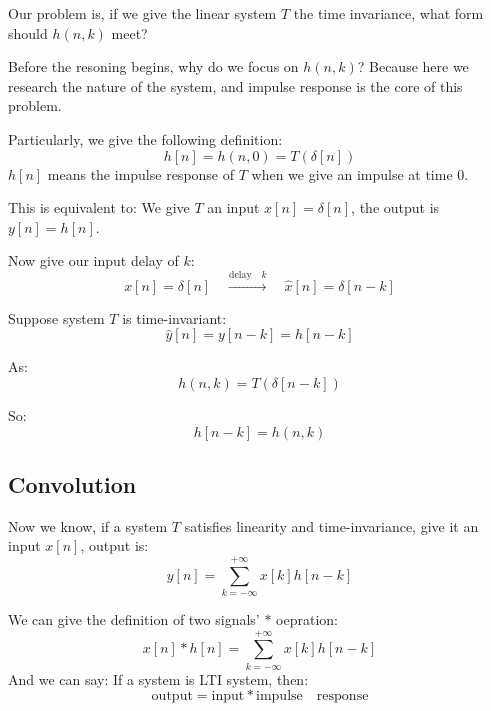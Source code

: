     Our problem is, if we give the linear system $T$ the time invariance, what form should $h(n,k)$ meet? 
    
    Before the resoning begins, why do we focus on $h(n,k)$? Because here we research the nature of the system,
    and impulse response is the core of this problem.

    Particularly, we give the following definition:
        \begin{equation}
            h[n] = h(n,0) = T(\delta[n])
        \end{equation}
    $h[n]$ means the impulse response of $T$ when we give an impulse at time 0.
    
    This is equivalent to: We give $T$ an input $x[n]=\delta[n]$, the output is $y[n]=h[n]$.

    Now give our input delay of $k$:
        \begin{equation}
            x[n]=\delta[n] \quad \xrightarrow{\mathrm{delay}\quad k} \quad \hat{x}[n]=\delta[n-k]
        \end{equation}

    Suppose system $T$ is time-invariant:
        \begin{equation}
            \hat{y}[n] = y[n-k] = h[n-k]
        \end{equation}

    As:
        \begin{equation}
            h(n,k) = T(\delta[n-k])
        \end{equation}

    So:
        \begin{equation}
            h[n-k] = h(n,k)
        \end{equation}
    
    \subsection{Convolution}
    Now we know, if a system $T$ satisfies linearity and time-invariance, give it an input $x[n]$, 
    output is:
        \begin{equation}
            y[n] = \sum_{k=-\infty}^{+\infty} x[k]h[n-k]
        \end{equation}
    
    We can give the definition of two signals' $\ast$ oepration:
        \begin{equation}
            x[n] \ast h[n] = \sum_{k=-\infty}^{+\infty} x[k]h[n-k]
        \end{equation}
    And we can say: If a system is LTI system, then:
        \begin{equation}
            \mathrm{output} = \mathrm{input} \ast  \mathrm{impulse \quad response}
        \end{equation}
    
